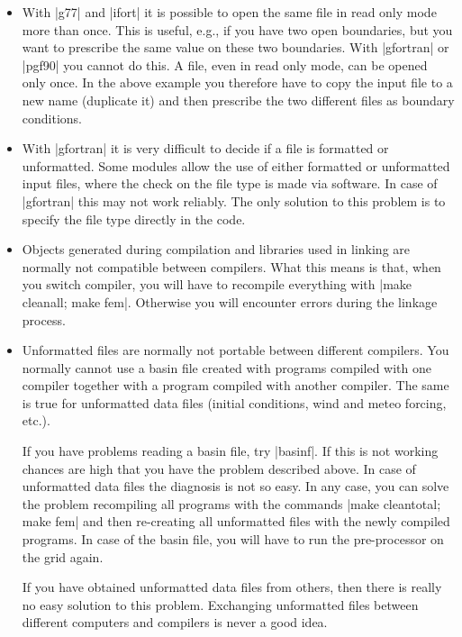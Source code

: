 \begin{itemize}

\item With |g77| and |ifort| it is possible to open the same file in
read only mode more than once. This is useful, e.g., if you have two
open boundaries, but you want to prescribe the same value on these
two boundaries. With |gfortran| or |pgf90| you cannot do this. A file,
even in read only mode, can be opened only once. In the above example
you therefore have to copy the input file to a new name (duplicate it)
and then prescribe the two different files as boundary conditions.

\item With |gfortran| it is very difficult to decide if a file is
formatted or unformatted. Some modules allow the use of either formatted
or unformatted input files, where the check on the file type is made
via software. In case of |gfortran| this may not work reliably. The only
solution to this problem is to specify the file type directly in the code.

\item Objects generated during compilation and libraries used in linking
are normally not compatible between compilers. What this means is that,
when you switch compiler, you will have to recompile everything with
|make cleanall; make fem|. Otherwise you will encounter errors during
the linkage process.

\item Unformatted files are normally not portable between different
compilers. You normally cannot use a basin file created with programs
compiled with one compiler together with a program compiled with another
compiler. The same is true for unformatted data files (initial conditions,
wind and meteo forcing, etc.).

If you have problems reading a basin file, try |basinf|. If this is
not working chances are high that you have the problem described above.
In case of unformatted data files the diagnosis is not so easy. In any
case, you can solve the problem recompiling all programs with the commands
|make cleantotal; make fem| and then re-creating all unformatted files
with the newly compiled programs. In case of the basin file, you will
have to run the pre-processor on the grid again.

If you have obtained unformatted data files from others, then there is
really no easy solution to this problem. Exchanging unformatted files
between different computers and compilers is never a good idea.


\end{itemize}

